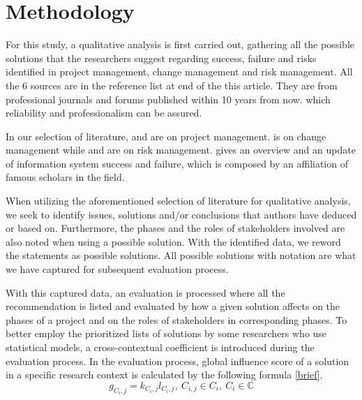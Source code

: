 
\section{Methodology}
For this study, a qualitative analysis is first carried out, gathering all the possible solutions that the researchers suggest regarding success, failure and risks identified in project management, change management and risk management. All the 6 sources are in the reference list at end of the this article. They are from professional journals and forums published within 10 years from now. which reliability and professionalism can be assured.

In our selection of literature,  and  are on project management.  is on change management while  and  are on risk management.  gives an overview and an update of information system success and failure, which is composed by an affiliation of famous scholars in the field.

When utilizing the aforementioned selection of literature for qualitative analysis, we seek to identify issues, solutions and/or conclusions that authors have deduced or based on. Furthermore, the phases and the roles of stakeholders involved are also noted when using a possible solution. With the identified data, we reword the statements as possible solutions. All possible solutions with notation are what we have captured for subsequent evaluation process.

With this captured data, an evaluation is processed where all the recommendation is listed and evaluated by how a given solution affects on the phases of a project and on the roles of stakeholders in corresponding phases. To better employ the prioritized lists of solutions by some researchers who use statistical models, a cross-contextual coefficient is introduced during the evaluation process. In the evaluation process, global influence score of a solution in a specific research context is calculated by the following formula \ref{brief}.
\begin{equation}
g_{C_{i},j} = \mathit{k_{C_{i},j}}l_{C_{i},j},\ C_{i,j} \in C_{i},\ C_{i} \in \mathbb{C}
\label{brief}
\end{equation}

